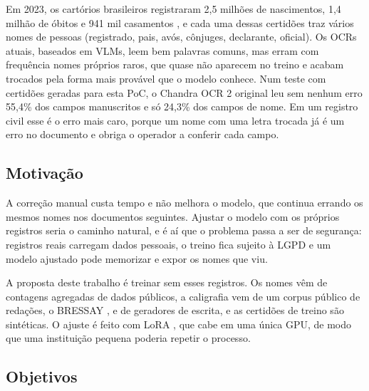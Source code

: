 \documentclass[12pt,a4paper]{article}
\begin{document}
Em 2023, os cartórios brasileiros registraram 2,5 milhões de nascimentos, 1,4 milhão de óbitos e 941 mil casamentos \cite{ibge_rc2023}, e cada uma dessas certidões traz vários nomes de pessoas (registrado, pais, avós, cônjuges, declarante, oficial). Os OCRs atuais, baseados em VLMs, leem bem palavras comuns, mas erram com frequência nomes próprios raros, que quase não aparecem no treino e acabam trocados pela forma mais provável que o modelo conhece. Num teste com certidões geradas para esta PoC, o Chandra OCR 2 original leu sem nenhum erro 55,4\% dos campos manuscritos e só 24,3\% dos campos de nome. Em um registro civil esse é o erro mais caro, porque um nome com uma letra trocada já é um erro no documento e obriga o operador a conferir cada campo.

\subsection{Motivação}

A correção manual custa tempo e não melhora o modelo, que continua errando os mesmos nomes nos documentos seguintes. Ajustar o modelo com os próprios registros seria o caminho natural, e é aí que o problema passa a ser de segurança: registros reais carregam dados pessoais, o treino fica sujeito à LGPD e um modelo ajustado pode memorizar e expor os nomes que viu.

A proposta deste trabalho é treinar sem esses registros. Os nomes vêm de contagens agregadas de dados públicos, a caligrafia vem de um corpus público de redações, o BRESSAY \cite{bressay2023}, e de geradores de escrita, e as certidões de treino são sintéticas. O ajuste é feito com LoRA \cite{lora2022}, que cabe em uma única GPU, de modo que uma instituição pequena poderia repetir o processo.

\subsection{Objetivos}
\end{document}
